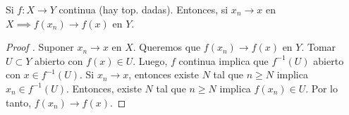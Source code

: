 \begin{lemma}
	Si $f: X \to Y$ continua (hay top. dadas). Entonces, si $x_n \to x$ en $X \implies f(x_n) \to f(x)$ en $Y$.
\end{lemma}
\begin{proof}[Proof ]
	Suponer $x_n \to x$ en $X$. Queremos que $f(x_n) \to f(x)$ en $Y$. Tomar $U \subset Y$ abierto con $f(x) \in U$. Luego, $f$ continua implica que $f^{-1}(U)$ abierto con $x \in f^{-1}(U)$. Si $x_n \to x$, entonces existe $N$ tal que $n\geq N$ implica $x_n \in f^{-1}(U)$. Entonces, existe $N$ tal que $n\geq N$ implica $f(x_n) \in U$. Por lo tanto, $f(x_n) \to f(x)$.
\end{proof}

